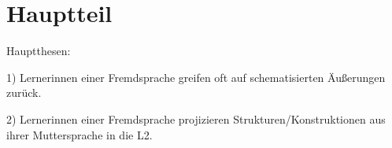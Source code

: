 \section{Hauptteil}

Hauptthesen:

1) Lernerinnen einer Fremdsprache greifen oft auf schematisierten Äußerungen zurück.

2) Lernerinnen einer Fremdsprache projizieren Strukturen/Konstruktionen aus ihrer Muttersprache in die L2.
